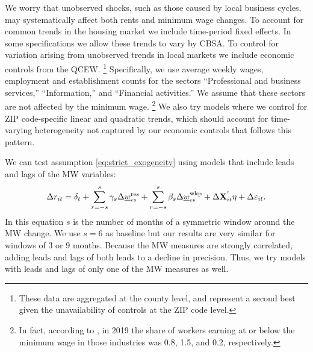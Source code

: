 We worry that unobserved shocks, such as those caused by local business cycles, 
may systematically affect both rents and minimum wage changes.
To account for common trends in the housing market we include time-period 
fixed effects.
In some specifications we allow these trends to vary by CBSA.
To control for variation arising from unobserved trends in local markets we 
include economic controls from the QCEW.%
\footnote{These data are aggregated at the county level, and represent a second 
best given the unavailability of controls at the ZIP code level.}
Specifically, we use average weekly wages, employment and establishment counts 
for the sectors ``Professional and business services,'' ``Information,'' and 
``Financial activities.''
We assume that these sectors are not affected by the minimum wage.%
\footnote{In fact, according to \textcite[][table 5]{MinWorkersReportBLS}, in 
2019 the share of workers earning at or below the minimum wage in those 
industries was 0.8, 1.5, and 0.2, respectively.}
We also try models where we control for ZIP code-specific linear and quadratic 
trends, which should account for time-varying heterogeneity not captured by our 
economic controls that follows this pattern.

We can test assumption \eqref{eq:strict_exogeneity} using models that include 
leads and lags of the MW variables:
\begin{equation} \label{eq:leads_lags}
    \Delta r_{it} = \delta_t
                  + \sum_{r=-s}^{s} \gamma_s \Delta \underline{w}^{\text{res}}_{is} 
                  + \sum_{r=-s}^{s} \beta_s \Delta \underline{w}^{\text{wkp}}_{is}
                  + \Delta \mathbf{X}^{'}_{it}\eta
                  + \Delta \varepsilon_{it} .
\end{equation}
In this equation $s$ is the number of months of a symmetric window around the 
MW change.
We use $s=6$ as baseline but our results are very similar for windows of 3 or 9 
months.
Because the MW measures are strongly correlated, adding leads and lags of both 
leads to a decline in precision.
Thus, we try models with leads and lags of only one of the MW measures as well.


